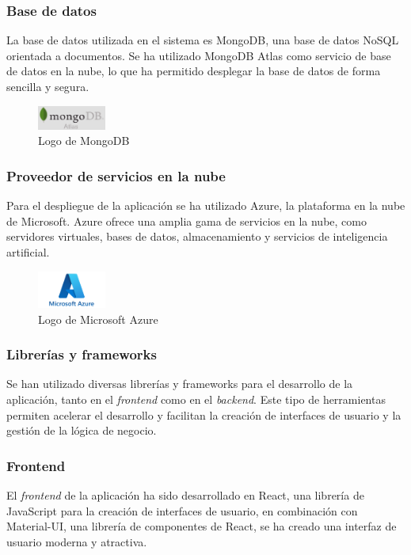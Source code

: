 \subsubsection{Base de datos}
La base de datos utilizada en el sistema es MongoDB, una base de datos NoSQL orientada a documentos.
Se ha utilizado MongoDB Atlas como servicio de base de datos en la nube, lo que ha permitido desplegar la base de datos de forma sencilla y segura.

\begin{figure}[H]
    \centering
    \includegraphics[width=0.2\textwidth]{figures/7-Construccion/mongodb.png}
    \caption{Logo de MongoDB}
\end{figure}


\subsubsection{Proveedor de servicios en la nube}
Para el despliegue de la aplicación se ha utilizado Azure, la plataforma en la nube de Microsoft.
Azure ofrece una amplia gama de servicios en la nube, como servidores virtuales, bases de datos, almacenamiento y servicios de inteligencia artificial.

\begin{figure}[H]
    \centering
    \includegraphics[width=0.2\textwidth]{figures/7-Construccion/MicrosoftAzure.png}
    \caption{Logo de Microsoft Azure}
\end{figure}


\subsubsection{Librerías y frameworks}
Se han utilizado diversas librerías y frameworks para el desarrollo de la aplicación, tanto en el \textit{frontend} como en el \textit{backend}.
Este tipo de herramientas permiten acelerar el desarrollo y facilitan la creación de interfaces de usuario y la gestión de la lógica de negocio.
\subsubsection{Frontend}
El \textit{frontend} de la aplicación ha sido desarrollado en React, una librería de JavaScript para la creación de interfaces de usuario,
en combinación con Material-UI, una librería de componentes de React, se ha creado una interfaz de usuario moderna y atractiva.

